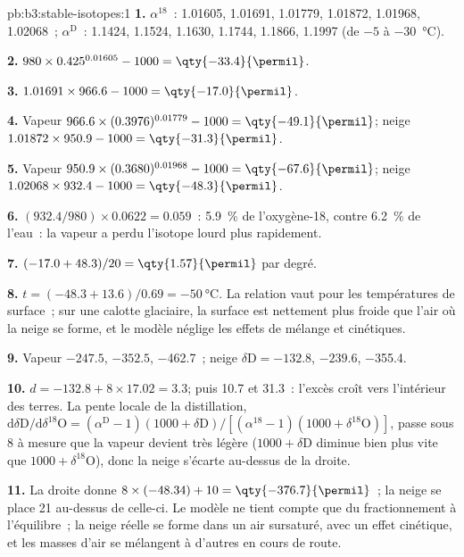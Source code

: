 \begin{solution}{pb:b3:stable-isotopes:1}
\textbf{1.} $\alpha^{18}$~: 1.01605, 1.01691, 1.01779, 1.01872, 1.01968,
1.02068~; $\alpha^{\mathrm D}$~: 1.1424, 1.1524, 1.1630, 1.1744, 1.1866, 1.1997
(de $-5$ à \qty{-30}{\celsius}).

\textbf{2.} $980\times0.425^{0.01605} - 1000 = \qty{-33.4}{\permil}$.

\textbf{3.} $1.01691\times966.6 - 1000 = \qty{-17.0}{\permil}$.

\textbf{4.} Vapeur $966.6\times(0.3976)^{0.01779} - 1000 = \qty{-49.1}{\permil}$;
neige $1.01872\times950.9 - 1000 = \qty{-31.3}{\permil}$.

\textbf{5.} Vapeur $950.9\times(0.3680)^{0.01968} - 1000 = \qty{-67.6}{\permil}$;
neige $1.02068\times932.4 - 1000 = \qty{-48.3}{\permil}$.

\textbf{6.} $(932.4/980)\times0.0622 = 0.059$~: \qty{5.9}{\percent} de
l'oxygène-18, contre \qty{6.2}{\percent} de l'eau~: la vapeur a perdu l'isotope
lourd plus rapidement.

\textbf{7.} $(-17.0 + 48.3)/20 = \qty{1.57}{\permil}$ par degré.

\textbf{8.} $t = (-48.3 + 13.6)/0.69 = \qty{-50}{\celsius}$. La relation vaut pour
les températures de surface~; sur une calotte glaciaire, la surface est nettement plus froide que
l'air où la neige se forme, et le modèle néglige les effets de mélange et cinétiques.

\textbf{9.} Vapeur $-247.5$, $-352.5$, \qty{-462.7}{\permil}~; neige $\delta\mathrm D
= -132.8$, $-239.6$, \qty{-355.4}{\permil}.

\textbf{10.} $d = -132.8 + 8\times17.02 = 3.3$; puis 10.7 et
\qty{31.3}{\permil}~: l'excès croît vers l'intérieur des terres. La pente locale de la
distillation, $\mathrm d\delta\mathrm D/\mathrm d\delta^{18}\mathrm O = (\alpha^{\mathrm D} -
1)(1000 + \delta\mathrm D)/[(\alpha^{18} - 1)(1000 + \delta^{18}\mathrm O)]$, passe sous
8 à mesure que la vapeur devient très légère ($1000 + \delta\mathrm D$ diminue bien plus vite que
$1000 + \delta^{18}\mathrm O$), donc la neige s'écarte au-dessus de la droite.

\textbf{11.} La droite donne $8\times(-48.34) + 10 = \qty{-376.7}{\permil}$~; la
neige se place \qty{21}{\permil} au-dessus de celle-ci. Le modèle ne tient compte que
du fractionnement à l'équilibre~; la neige réelle se forme dans un air sursaturé,
avec un effet cinétique, et les masses d'air se mélangent à d'autres en cours de route.


\end{solution}
